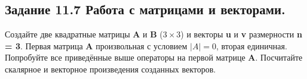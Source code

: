 \subsection*{\textbf{Задание 11.7} Работа с матрицами и векторами.}
Создайте две квадратные матрицы \textbf{A} и \textbf{B} (\textbf{$3\times3$}) и векторы \textbf{u} и \textbf{v}
размерности \textbf{n = 3}.
Первая матрица \textbf{A} произвольная с условием \textbf{$|A| = 0$}, вторая единичная.
Попробуйте все приведённые выше операторы на первой матрице \textbf{A}.
Посчитайте скалярное и векторное произведения созданных векторов.

\begin{figure}[H]
    \renewcommand{\figurename}{Рисунок}
    \label{fig:image_7_1}
\end{figure}

